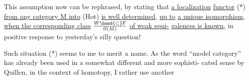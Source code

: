 This assumption now can be rephrased, by stating that \uline{a localization}
\uline{functor} \xout{(*)} (*) \uline{from any category M into} (Hot) \uline{is well determined}, \uline{up to}
\uline{a unique isomorphism}, \uline{when the corresponding class} $W \hand{\subset} \mathrm{F}\over{l}{l}(M)$ \uline{of weak equi-}%
\uline{valences is known}, in positive response to yesterday's silly question!

Such situation (*) seems to me to merit a name. As the word ``model
category'' has already been used in a somewhat different and more sophisti-%
cated sense by Quillen, in the context of homotopy, I rather use another
